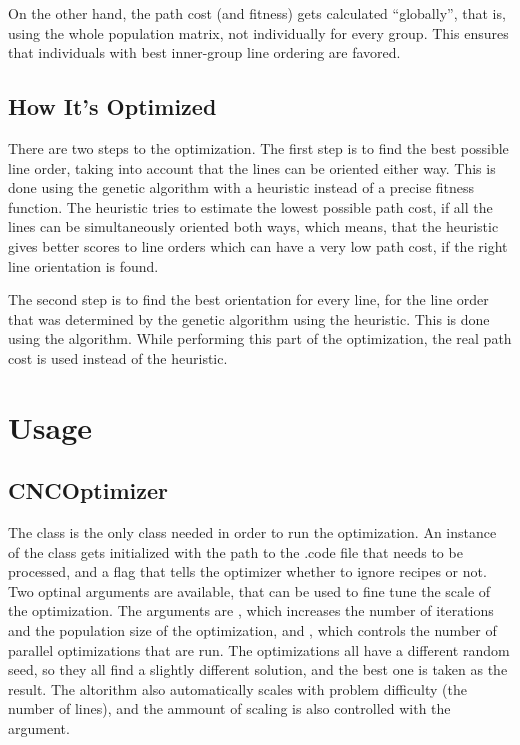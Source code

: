 \documentclass[letterpaper,10pt,english,openany,oneside]{sphinxmanual}
\begin{document}
On the other hand, the path cost (and fitness) gets calculated “globally”, that
is, using the whole population matrix, not individually for every group. This
ensures that individuals with best inner-group line ordering are favored.


\section{How It’s Optimized}
\label{\detokenize{implementation_details:how-it-s-optimized}}
There are two steps to the optimization. The first step is to find the best
possible line order, taking into account that the lines can be oriented either
way. This is done using the genetic algorithm with a heuristic instead of a
precise fitness function. The heuristic tries to estimate the lowest possible
path cost, if all the lines can be simultaneously oriented both ways, which
means, that the heuristic gives better scores to line orders which can
 have a very low path cost, if the right line orientation is
found.

The second step is to find the best orientation for every line, for the line
order that was determined by the genetic algorithm using the heuristic. This is
done using the  algorithm. While performing this part of the
optimization, the real path cost is used instead of the heuristic.


\chapter{Usage}
\label{\detokenize{usage:usage}}\label{\detokenize{usage::doc}}

\section{CNCOptimizer}
\label{\detokenize{usage:cncoptimizer}}
The  class is the only class needed in order to run the
optimization. An instance of the class gets initialized with the path to the
.code file that needs to be processed, and a flag that tells the optimizer
whether to ignore recipes or not. Two optinal arguments are available, that can
be used to fine tune the scale of the optimization. The arguments are
, which increases the number of iterations and the population size
of the optimization, and , which controls the number of parallel
optimizations that are run. The optimizations all have a different random seed,
so they all find a slightly different solution, and the best one is taken as
the result. The altorithm also automatically scales with problem difficulty
(the number of lines), and the ammount of scaling is also controlled with the
 argument.
\end{document}
